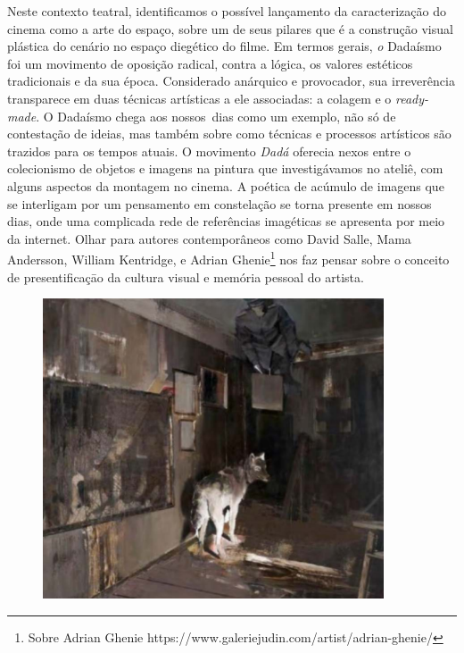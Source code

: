 Neste contexto teatral, identificamos o possível lançamento da
caracterização do cinema como a arte do espaço, sobre um de seus
pilares que é a construção visual plástica do cenário no espaço
diegético do filme. Em termos gerais, \emph{o} Dadaísmo foi um
movimento de oposição radical, contra a lógica, os valores estéticos
tradicionais e da sua época. Considerado anárquico e provocador, sua
irreverência transparece em duas técnicas artísticas a ele associadas:
a colagem e o \emph{ready-made}. O Dadaísmo chega aos nossos~dias como
um exemplo, não só de contestação de ideias, mas também sobre como
técnicas e processos artísticos são trazidos para os tempos atuais. O
movimento \emph{Dadá} oferecia nexos entre o colecionismo de objetos e
imagens na pintura que investigávamos no ateliê, com alguns aspectos da
montagem no cinema. A poética de acúmulo de imagens que se interligam
por um pensamento em constelação se torna presente em nossos dias, onde
uma complicada rede de referências imagéticas se apresenta por meio da
internet. Olhar para autores contemporâneos como David Salle, Mama
Andersson, William Kentridge, e Adrian Ghenie\footnote{Sobre Adrian
	Ghenie https://www.galeriejudin.com/artist/adrian-ghenie/} nos faz
pensar sobre o conceito de
presentificaçāo da cultura visual e
memória pessoal do artista.

\begin{figure}
	\caption{}

	\includegraphics[width=3.98229in,height=3.50617in]{figuras/ghenie-dada-is-dead-2009.pdf.compressed.pdf}
\end{figure}

